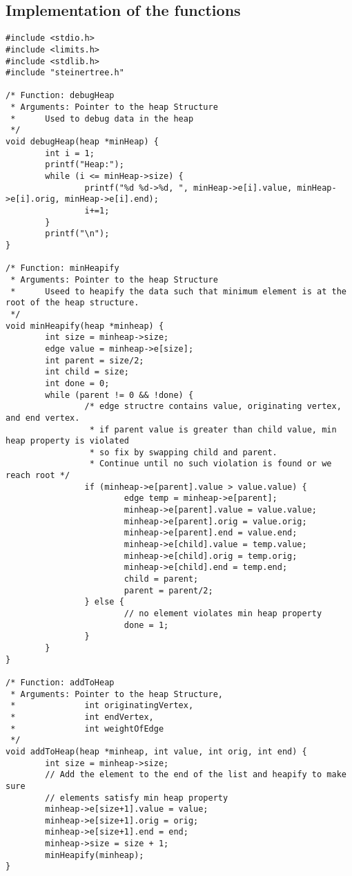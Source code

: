 \documentclass[a4paper]{article}
\begin{document}
\subsection{Implementation of the functions}
\begin{lstlisting}
#include <stdio.h>
#include <limits.h>
#include <stdlib.h>
#include "steinertree.h"

/* Function: debugHeap
 * Arguments: Pointer to the heap Structure
 *      Used to debug data in the heap
 */
void debugHeap(heap *minHeap) {
        int i = 1;
        printf("Heap:");
        while (i <= minHeap->size) {
                printf("%d %d->%d, ", minHeap->e[i].value, minHeap->e[i].orig, minHeap->e[i].end);
                i+=1;
        }
        printf("\n");
}

/* Function: minHeapify
 * Arguments: Pointer to the heap Structure
 *      Useed to heapify the data such that minimum element is at the root of the heap structure.
 */
void minHeapify(heap *minheap) {
        int size = minheap->size;
        edge value = minheap->e[size];
        int parent = size/2;
        int child = size;
        int done = 0;
        while (parent != 0 && !done) {
                /* edge structre contains value, originating vertex, and end vertex.
                 * if parent value is greater than child value, min heap property is violated
                 * so fix by swapping child and parent.
                 * Continue until no such violation is found or we reach root */
                if (minheap->e[parent].value > value.value) {
                        edge temp = minheap->e[parent];
                        minheap->e[parent].value = value.value;
                        minheap->e[parent].orig = value.orig;
                        minheap->e[parent].end = value.end;
                        minheap->e[child].value = temp.value;
                        minheap->e[child].orig = temp.orig;
                        minheap->e[child].end = temp.end;
                        child = parent;
                        parent = parent/2;
                } else {
                        // no element violates min heap property
                        done = 1;
                }
        }
}

/* Function: addToHeap
 * Arguments: Pointer to the heap Structure,
 *              int originatingVertex,
 *              int endVertex,
 *              int weightOfEdge
 */
void addToHeap(heap *minheap, int value, int orig, int end) {
        int size = minheap->size;
        // Add the element to the end of the list and heapify to make sure
        // elements satisfy min heap property
        minheap->e[size+1].value = value;
        minheap->e[size+1].orig = orig;
        minheap->e[size+1].end = end;
        minheap->size = size + 1;
        minHeapify(minheap);
}


\end{lstlisting}
\end{document}
